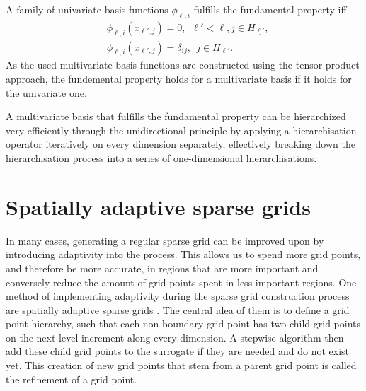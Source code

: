 \documentclass[
  a4paper,  %
  twoside,  %
  bibliography=totoc,
  headsepline,
  cleardoublepage=empty,
  parskip=half,
  draft=false
]{scrbook}
\begin{document}
\begin{definition}
A family of univariate basis functions $\phi_{\ell,i}$ fulfills the fundamental property iff
\begin{equation}
\begin{split}
&\phi_{\ell,i}(x_{\ell', j}) = 0, ~~  \ell' < \ell, j \in H_{\underline{\ell'}},\\
&\phi_{\ell,i}(x_{\ell', j}) = \delta_{ij}, ~~  j \in H_{\underline{\ell'}}.
\end{split}
\end{equation}
As the used multivariate basis functions are constructed using the tensor-product approach, the fundemental property holds for a multivariate basis if it holds for the univariate one.
\end{definition}
%
A multivariate basis that fulfills the fundamental property can be hierarchized very efficiently through the unidirectional principle \cite{Balder1994} by applying a hierarchisation operator iteratively on every dimension separately, effectively breaking down the hierarchisation process into a series of one-dimensional hierarchisations.

\section{Spatially adaptive sparse grids}

In many cases, generating a regular sparse grid can be improved upon by introducing adaptivity into the process.
This allows us to spend more grid points, and therefore be more accurate, in regions that are more important and conversely reduce the amount of grid points spent in less important regions.
One method of implementing adaptivity during the sparse grid construction process are spatially adaptive sparse grids \cite{Pflueger2012}.
The central idea of them is to define a grid point hierarchy, such that each non-boundary grid point has two child grid points on the next level increment along every dimension.
A stepwise algorithm then add these child grid points to the surrogate if they are needed and do not exist yet.
This creation of new grid points that stem from a parent grid point is called the refinement of a grid point.
\end{document}
